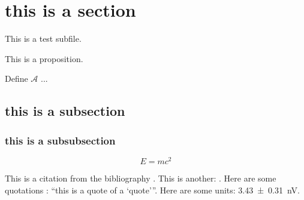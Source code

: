 \documentclass[../main.tex]{subfiles}
\begin{document}
\section{this is a section}
This is a test subfile.

\begin{proposition}
	This is a proposition.
\end{proposition}
\begin{definition}
	Define $\mathscr{A}$ ...
\end{definition}
\subsection{this is a subsection}
\subsubsection{this is a subsubsection}
\begin{equation}
	E = m c^2
\end{equation}

This is a citation from the bibliography \cite{haskell}.
This is another: \cite{quantum_optics}.
Here are some quotations : \enquote{this is a quote of a \enquote{quote}}.
Here are some units: \SI{3.43 \pm 0.31}{\nano \volt}.
\end{document}
